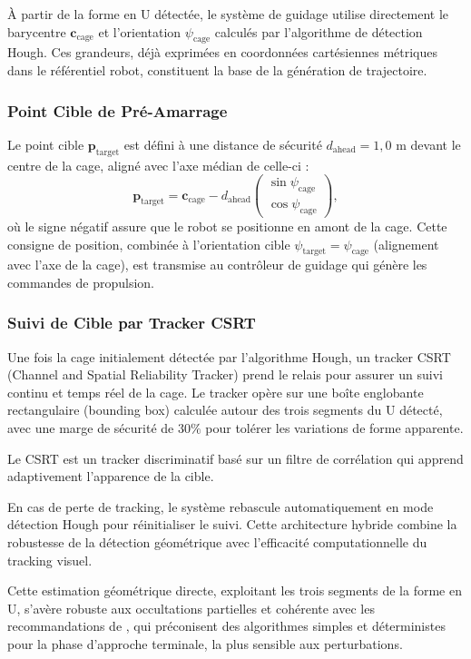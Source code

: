 À partir de la forme en U détectée, le système de guidage utilise directement le barycentre $\mathbf{c}_{\text{cage}}$ et l'orientation $\psi_{\text{cage}}$ calculés par l'algorithme de détection Hough. Ces grandeurs, déjà exprimées en coordonnées cartésiennes métriques dans le référentiel robot, constituent la base de la génération de trajectoire.

\subsubsection*{Point Cible de Pré-Amarrage}

Le point cible $\mathbf{p}_{\text{target}}$ est défini à une distance de sécurité $d_{\text{ahead}} = 1{,}0$ m devant le centre de la cage, aligné avec l'axe médian de celle-ci :
\[
\mathbf{p}_{\text{target}} = \mathbf{c}_{\text{cage}} - d_{\text{ahead}} \begin{pmatrix}\sin\psi_{\text{cage}} \\ \cos\psi_{\text{cage}}\end{pmatrix},
\]
où le signe négatif assure que le robot se positionne en amont de la cage. Cette consigne de position, combinée à l'orientation cible $\psi_{\text{target}} = \psi_{\text{cage}}$ (alignement avec l'axe de la cage), est transmise au contrôleur de guidage qui génère les commandes de propulsion.

\subsubsection*{Suivi de Cible par Tracker CSRT}

Une fois la cage initialement détectée par l'algorithme Hough, un tracker CSRT (Channel and Spatial Reliability Tracker) prend le relais pour assurer un suivi continu et temps réel de la cage. Le tracker opère sur une boîte englobante rectangulaire (bounding box) calculée autour des trois segments du U détecté, avec une marge de sécurité de $30\%$ pour tolérer les variations de forme apparente.

Le CSRT est un tracker discriminatif basé sur un filtre de corrélation qui apprend adaptivement l'apparence de la cible.

En cas de perte de tracking, le système rebascule automatiquement en mode détection Hough pour réinitialiser le suivi. Cette architecture hybride combine la robustesse de la détection géométrique avec l'efficacité computationnelle du tracking visuel.

Cette estimation géométrique directe, exploitant les trois segments de la forme en U, s'avère robuste aux occultations partielles et cohérente avec les recommandations de \cite{uchihori2019_3dsonar_docking}, qui préconisent des algorithmes simples et déterministes pour la phase d'approche terminale, la plus sensible aux perturbations.

